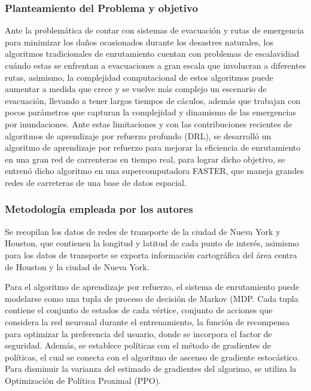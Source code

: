 \subsubsection{Planteamiento del Problema y objetivo }
Ante la problemática de contar con sistemas de evacuación y rutas de emergencia para minimizar los daños ocasionados durante los desastres naturales, los algoritmos tradicionales de enrutamiento cuentan con problemas de escalavidiad cuándo estas se enfrentan a evacuaciones a gran escala que involucran a diferentes rutas, asimismo, la complejidad computacional de estos algoritmos puede aumentar a medida que crece y se vuelve más complejo un escenario de evacuación, llevando a tener largos tiempos de cáculos, además que trabajan con pocos parámetros que capturan la complejidad y dinamismo de las emergencias por inundaciones. Ante estas limitaciones y con las contribuciones recientes de algoritmos de aprendizaje por refuerzo profundo (DRL), se desarrolló un algoritmo de aprendizaje por refuerzo para mejorar la eficiencia de enrutamiento en una gran red de carrenteras en tiempo real, para lograr dicho objetivo, se entrenó dicho algoritmo en una supercomputadora FASTER, que maneja grandes redes de carreteras de una base de datos espacial.

\subsubsection{Metodología empleada por los autores}
Se recopilan los datos de redes de transporte de la ciudad de Nueva York y Houston, que contienen la longitud y latitud de cada punto de interés, asimismo para los datos de transporte se exporta información cartográfica del área centra de Houston y la ciudad de Nueva York. 

Para el algoritmo de aprendizaje por refuerzo, el sistema de enrutamiento puede modelarse como una tupla de proceso de decisión de Markov (MDP. Cada tupla contiene el conjunto de estados de cada vértice, conjunto de acciones que considera la red neuronal durante el entrenamiento, la función de recompensa para optimizar la preferencia del usuario, donde se incorpora el factor de seguridad. Además, se establece políticas con el método de gradientes de políticas, el cual se conecta con el algoritmo de ascenso de gradiente estocástico. Para disminuir la varianza del estimado de gradientes del algorimo, se utiliza la Optimización de Política Proximal (PPO). 

